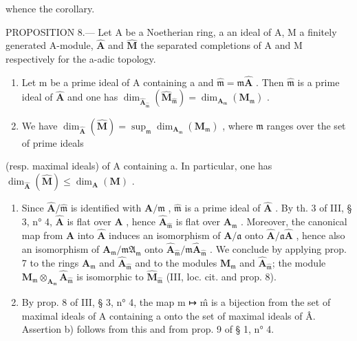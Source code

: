 whence the corollary.

PROPOSITION 8.--- Let A be a Noetherian ring, a an ideal of A, M a finitely generated A-module, \(\hat{\mathbf{A}}\) and \(\hat{\mathbf{M}}\) the separated completions of A and M respectively for the a-adic topology.

\begin{enumerate}
\def\labelenumi{\alph{enumi})}
\item
  Let m be a prime ideal of A containing a and \(\hat{\mathfrak{m}} = \mathfrak{m}\hat{\mathbf{A}}\) . Then \(\hat{\mathfrak{m}}\) is a prime ideal of \(\hat{\mathbf{A}}\) and one has \(\dim_{\hat{\mathbf{A}}_{\hat{\mathfrak{m}}}}(\hat{\mathbf{M}}_{\hat{\mathfrak{m}}}) = \dim_{\mathbf{A}_{\mathfrak{m}}}(\mathbf{M}_{\mathfrak{m}})\) .
\item
  We have \(\dim_{\hat{\mathbf{A}}}(\hat{\mathbf{M}}) = \sup_{\mathfrak{m}} \dim_{\mathbf{A}_{\mathfrak{m}}}(\mathbf{M}_{\mathfrak{m}})\) , where \(\mathfrak{m}\) ranges over the set of prime ideals
\end{enumerate}

(resp. maximal ideals) of A containing a. In particular, one has \(\dim_{\hat{\mathbf{A}}}(\hat{\mathbf{M}}) \leqslant \dim_{\mathbf{A}}(\mathbf{M})\) .

\begin{enumerate}
\def\labelenumi{\alph{enumi})}
\item
  Since \(\hat{\mathbf{A}}/\hat{\mathfrak{m}}\) is identified with \(\mathbf{A}/\mathfrak{m}\) , \(\hat{\mathfrak{m}}\) is a prime ideal of \(\hat{\mathbf{A}}\) . By th. 3 of III, § 3, n° 4, \(\hat{\mathbf{A}}\) is flat over \(\mathbf{A}\) , hence \(\hat{\mathbf{A}}_{\hat{\mathfrak{m}}}\) is flat over \(\mathbf{A}_{\mathfrak{m}}\) . Moreover, the canonical map from \(\mathbf{A}\) into \(\hat{\mathbf{A}}\) induces an isomorphism of \(\mathbf{A}/\mathfrak{a}\) onto \(\hat{\mathbf{A}}/\mathfrak{a}\hat{\mathbf{A}}\) , hence also an isomorphism of \(\mathbf{A}_{\mathfrak{m}}/\mathfrak{mA}_{\mathfrak{m}}\) onto \(\hat{\mathbf{A}}_{\hat{\mathfrak{m}}}/\mathfrak{m}\hat{\mathbf{A}}_{\hat{\mathfrak{m}}}\) . We conclude by applying prop. 7 to the rings \(\mathbf{A}_{\mathfrak{m}}\) and \(\hat{\mathbf{A}}_{\hat{\mathfrak{m}}}\) and to the modules \(\mathbf{M}_{\mathfrak{m}}\) and \(\hat{\mathbf{A}}_{\hat{\mathfrak{m}}}\); the module \(\mathbf{M}_{\mathfrak{m}} \otimes_{\mathbf{A}_{\mathfrak{m}}} \hat{\mathbf{A}}_{\hat{\mathfrak{m}}}\) is isomorphic to \(\hat{\mathbf{M}}_{\hat{\mathfrak{m}}}\) (III, loc. cit. and prop. 8).
\item
  By prop. 8 of III, § 3, n° 4, the map m ↦ m̂ is a bijection from the set of maximal ideals of A containing a onto the set of maximal ideals of Â. Assertion b) follows from this and from prop. 9 of § 1, n° 4.
\end{enumerate}

